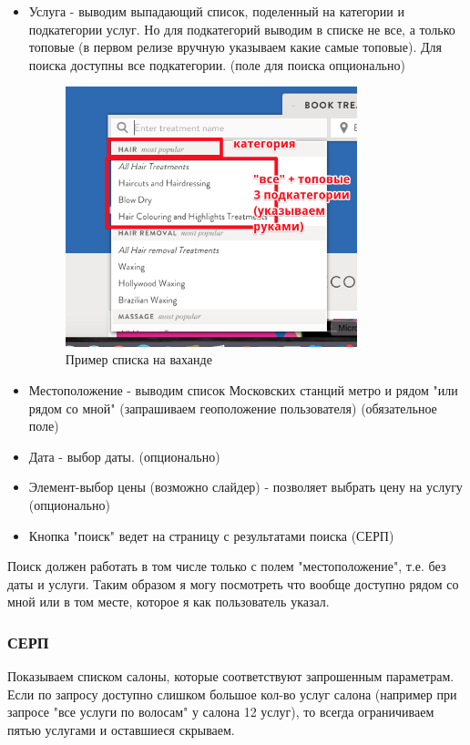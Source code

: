 \documentclass[DIV=calc, paper=a4, fontsize=11pt]{scrartcl} %
\begin{document}
\begin{itemize}
	\item Услуга - выводим выпадающий список, поделенный на категории и подкатегории услуг. Но для подкатегорий выводим в списке не все, а только топовые (в первом релизе вручную указываем какие самые топовые). Для поиска доступны все подкатегории. (поле для поиска опционально)
	 \begin{figure}[H]
        \centering
        \includegraphics[width=320px]{search_field1.jpg}
        \caption{Пример списка на ваханде\label{fig:search_field1.jpg}}
        \end{figure}
        
     \item Местоположение - выводим список Московских станций метро и рядом "или рядом со мной" (запрашиваем геоположение пользователя) (обязательное поле)
     \item Дата - выбор даты. (опционально)
     \item Элемент-выбор цены (возможно слайдер) - позволяет выбрать цену на услугу (опционально)
     \item Кнопка "поиск" ведет на страницу с результатами поиска (СЕРП)
\end{itemize}

Поиск должен работать в том числе только с полем "местоположение", т.е. без даты и услуги. Таким образом я могу посмотреть что вообще доступно рядом со мной или в том месте, которое я как пользователь указал.

\subsubsection{СЕРП}

Показываем списком салоны, которые соответствуют запрошенным параметрам. Если по запросу доступно слишком большое кол-во услуг салона (например при запросе "все услуги по волосам" у салона 12 услуг), то всегда ограничиваем пятью услугами и оставшиеся скрываем.
\end{document}
